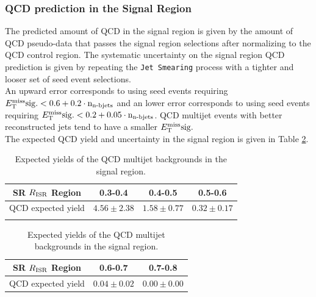 \subsubsection{QCD prediction in the Signal Region}

\indent The predicted amount of QCD in the signal region is given by the amount of QCD pseudo-data that passes the signal region selections after normalizing to the QCD control region. The systematic uncertainty on the signal region QCD prediction is given by repeating the {\tt Jet Smearing} process with a tighter and looser set of seed event selections.  \\

\indent An upward error corresponds to using seed events requiring $E_{\mathrm{T}}^{\mathrm{miss}}\rm{sig.} < 0.6 + 0.2\cdot n_{\textup{n-bjets}}$ and an lower error corresponds to using seed events requiring $E_{\mathrm{T}}^{\mathrm{miss}}\rm{sig.} < 0.2 + 0.05\cdot n_{\textup{n-bjets}}$. QCD multijet events with better reconstructed jets tend to have a smaller $E_{\mathrm{T}}^{\mathrm{miss}}\rm{sig.}$ \\

\indent The expected QCD yield and uncertainty in the signal region is given in Table \ref{tab:QCDYields}.\\

\begin{table}[!h]
  \caption{Expected yields of the QCD multijet backgrounds in the signal region.}
  \label{tab:QCDYields}
  \begin{center}
  \setlength{\tabcolsep}{0.0pc}
    \begin{tabular}{c|c|c|c} \hline\hline
SR $R_{\mathrm{ISR}}$ Region       & 0.3-0.4              & 0.4-0.5              & 0.5-0.6              \\ \hline
QCD expected yield & $4.56\pm2.38$ & $1.58\pm0.77$ & $0.32\pm0.17$  \\ \hline \hline
\noalign{\smallskip}\noalign{\smallskip}
    \end{tabular}
    
        \begin{tabular}{c|c|c} \hline\hline
SR $R_{\mathrm{ISR}}$ Region         & 0.6-0.7             & 0.7-0.8 \\ \hline
QCD expected yield       & $0.04\pm0.02$ & $0.00\pm0.00$ \\ \hline \hline
    \end{tabular}
  \end{center}
\end{table}%
